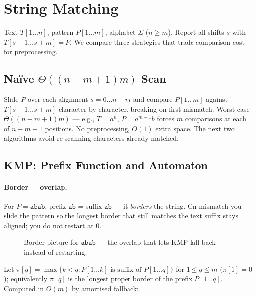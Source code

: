 \section{String Matching}
\label{sec:string}
Text $T[1\ldots n]$, pattern $P[1\ldots m]$, alphabet $\Sigma$ ($n\ge m$). Report all shifts $s$ with $T[s+1\ldots s+m]=P$. We compare three strategies that trade comparison cost for preprocessing.

\subsection{Na\"ive \texorpdfstring{$\Theta((n-m+1)m)$}{Theta((n-m+1)m)} Scan}
Slide $P$ over each alignment $s=0\ldots n-m$ and compare $P[1\ldots m]$ against $T[s+1\ldots s+m]$ character by character, breaking on first mismatch. Worst case $\Theta((n-m+1)m)$ --- e.g., $T=a^n$, $P=a^{m-1}b$ forces $m$ comparisons at each of $n-m+1$ positions. No preprocessing, $O(1)$ extra space. The next two algorithms avoid re-scanning characters already matched.

\subsection{KMP: Prefix Function and Automaton}
\paragraph{Border = overlap.} For $P=\mathtt{abab}$, prefix $\mathtt{ab}$ = suffix $\mathtt{ab}$ --- it \emph{borders} the string. On mismatch you slide the pattern so the longest border that still matches the text suffix stays aligned; you do not restart at $0$.
\begin{figure}[h]\centering{}\caption{Border picture for $\mathtt{abab}$ --- the overlap that lets KMP fall back instead of restarting.}\label{fig:kmp-border}\end{figure}
Let $\pi[q]=\max\{k<q: P[1\ldots k]\text{ is suffix of }P[1\ldots q]\}$ for $1\le q\le m$ ($\pi[1]=0$); equivalently $\pi[q]$ is the longest proper border of the prefix $P[1\ldots q]$. Computed in $O(m)$ by amortised fallback:

